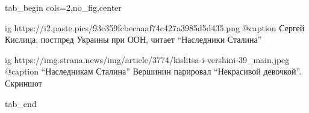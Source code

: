  
 
 
 
 

\ifcmt
tab_begin cols=2,no_fig,center

	ig https://i2.paste.pics/93c359fcbecaaaf74c427a3985d5d435.png
	@caption Сергей Кислица, постпред Украины при ООН, читает \enquote{Наследники Сталина}

  ig https://img.strana.news/img/article/3774/kislitsa-i-vershini-39_main.jpeg
  @caption \enquote{Наследникам Сталина} Вершинин парировал \enquote{Некрасивой девочкой}. Скриншот 

tab_end
\fi

